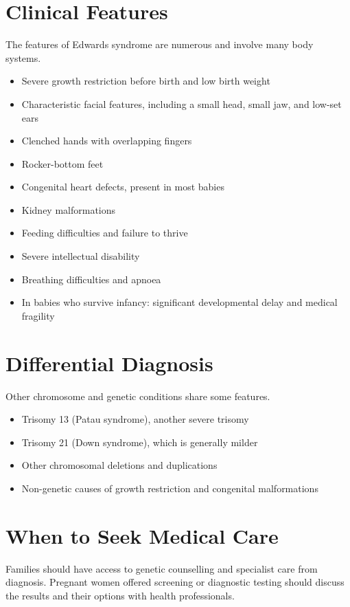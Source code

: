 \section*{Clinical Features}
The features of Edwards syndrome are numerous and involve many body systems.
\begin{itemize}
    \item Severe growth restriction before birth and low birth weight
    \item Characteristic facial features, including a small head, small jaw, and low-set ears
    \item Clenched hands with overlapping fingers
    \item Rocker-bottom feet
    \item Congenital heart defects, present in most babies
    \item Kidney malformations
    \item Feeding difficulties and failure to thrive
    \item Severe intellectual disability
    \item Breathing difficulties and apnoea
    \item In babies who survive infancy: significant developmental delay and medical fragility
\end{itemize}

\section*{Differential Diagnosis}
Other chromosome and genetic conditions share some features.
\begin{itemize}
    \item Trisomy 13 (Patau syndrome), another severe trisomy
    \item Trisomy 21 (Down syndrome), which is generally milder
    \item Other chromosomal deletions and duplications
    \item Non-genetic causes of growth restriction and congenital malformations
\end{itemize}

\section*{When to Seek Medical Care}
Families should have access to genetic counselling and specialist care from diagnosis. Pregnant women offered screening or diagnostic testing should discuss the results and their options with health professionals.

